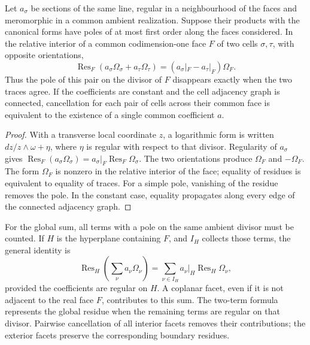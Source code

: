 \begin{theorem}
\label{thm:compat-pegado}
Let \(a_\sigma\) be sections of the same line, regular in a
neighbourhood of the faces and meromorphic in a common ambient realization.
Suppose their products with the canonical forms have poles of at
most first order along the faces considered. In the
relative interior of a common codimension-one face \(F\) of two cells
\(\sigma,\tau\), with opposite orientations,
\begin{equation}
 \operatorname{Res}_F\left(a_\sigma\Omega_\sigma+a_\tau\Omega_\tau\right)
 =\left(a_\sigma|_F-a_\tau|_F\right)\Omega_F.
 \label{eq:compat-defecto-frontera}
\end{equation}
Thus the pole of this pair on the divisor of \(F\) disappears
exactly when the two traces agree. If the coefficients are
constant and the cell adjacency graph is connected, cancellation
for each pair of cells across their common face is equivalent to the existence
of a single common coefficient \(a\).
\end{theorem}
\begin{proof}
With a transverse local coordinate \(z\), a logarithmic form is
written \(dz/z\wedge\omega+\eta\), where \(\eta\) is regular
with respect to that divisor. Regularity of \(a_\sigma\) gives
\(\operatorname{Res}_F(a_\sigma\Omega_\sigma)
=a_\sigma|_F\operatorname{Res}_F\Omega_\sigma\).
The two orientations produce \(\Omega_F\) and \(-\Omega_F\).
The form \(\Omega_F\) is nonzero in the relative interior of the
face; equality of residues is equivalent to equality of traces.
For a simple pole, vanishing of the residue removes the pole.
In the constant case, equality propagates along every
edge of the connected adjacency graph.
\end{proof}

For the global sum, all terms with a pole on the
same ambient divisor must be counted. If \(H\) is the hyperplane containing \(F\),
and \(I_H\) collects those terms, the general identity is
\[
 \operatorname{Res}_{H}\left(\sum_\nu a_\nu\Omega_\nu\right)
 =\sum_{\nu\in I_H}a_\nu|_H\operatorname{Res}_H\Omega_\nu,
\]
provided the coefficients are regular on \(H\). A coplanar
facet, even if it is not adjacent to the real face \(F\), contributes to this
sum. The two-term formula represents the global residue when
the remaining terms are regular on that divisor. Pairwise cancellation
of all interior facets removes their contributions;
the exterior facets preserve the corresponding boundary residues.

